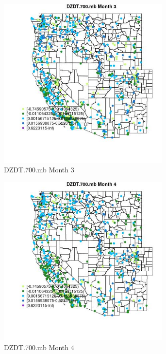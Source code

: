 \begin{figure} 
\centering  
\includegraphics[width=0.77\textwidth]{Code_Outputs/Report_ML_input_PM25_Step4_part_e_de_duplicated_aves_compiled_2019-05-21wNAs_MapObsMo3DZDT700mb.jpg} 
\caption{\label{fig:Report_ML_input_PM25_Step4_part_e_de_duplicated_aves_compiled_2019-05-21wNAsMapObsMo3DZDT700mb}DZDT.700.mb Month 3} 
\end{figure} 
 

\begin{figure} 
\centering  
\includegraphics[width=0.77\textwidth]{Code_Outputs/Report_ML_input_PM25_Step4_part_e_de_duplicated_aves_compiled_2019-05-21wNAs_MapObsMo4DZDT700mb.jpg} 
\caption{\label{fig:Report_ML_input_PM25_Step4_part_e_de_duplicated_aves_compiled_2019-05-21wNAsMapObsMo4DZDT700mb}DZDT.700.mb Month 4} 
\end{figure} 
 

